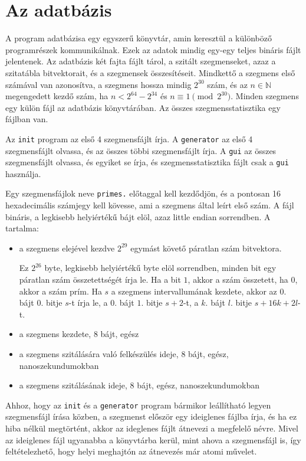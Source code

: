 \section{Az adatbázis}

A program adatbázisa egy egyszerű könyvtár, amin keresztül a különböző programrészek kommunikálnak.
Ezek az adatok mindig egy-egy teljes bináris fájlt jelentenek.
Az adatbázis két fajta fájlt tárol, a szitált szegmenseket, azaz a szitatábla bitvektorait, és a szegmensek összesítéseit.
Mindkettő a szegmens első számával van azonosítva, a szegmens hossza mindig $2^{30}$ szám, és az $n \in \mathbb{N}$ megengedett kezdő szám, ha $n < 2^{64}-2^{34}$ és $n \equiv 1 \pmod{2^{30}}$.
Minden szegmens egy külön fájl az adatbázis könyvtárában.
Az összes szegmensstatisztika egy fájlban van.

Az \texttt{init} program az első 4 szegmensfájlt írja.
A \texttt{generator} az első 4 szegmensfájlt olvassa, és az összes többi szegmensfájlt írja.
A \texttt{gui} az összes szegmensfájlt olvassa, és egyiket se írja, és szegmensstatisztika fájlt csak a \texttt{gui} használja.

Egy szegmensfájlok neve \texttt{primes.} előtaggal kell kezdődjön, és a pontosan 16 hexadecimális számjegy kell kövesse, ami a szegmens által leírt első szám.
A fájl bináris, a legkisebb helyiértékű bájt elöl, azaz little endian sorrendben.
A tartalma:
\begin{itemize}
\item a szegmens elejével kezdve $2^{29}$ egymást követő páratlan szám bitvektora.
	
Ez $2^{26}$ byte, legkisebb helyiértékű byte elöl sorrendben, minden bit egy páratlan szám összetettségét írja le.
Ha a bit $1$, akkor a szám összetett, ha $0$, akkor a szám prím.
Ha $s$ a szegmens intervallumának kezdete, akkor az $0.$ bájt $0.$ bitje $s$-t írja le, a $0.$ bájt $1.$ bitje $s+2$-t, a $k.$ bájt $l.$ bitje $s+16k+2l$-t.
	
\item a szegmens kezdete, 8 bájt, egész
\item a szegmens szitálására való felkészülés ideje, 8 bájt, egész, nanoszekundumokban
\item a szegmens szitálásának ideje, 8 bájt, egész, nanoszekundumokban
\end{itemize}

Ahhoz, hogy az \texttt{init} és a \texttt{generator} program bármikor leállítható legyen szegmensfájl írása közben, a szegmenst először egy ideiglenes fájlba írja, és ha ez hiba nélkül megtörtént, akkor az ideglenes fájlt átnevezi a megfelelő névre.
Mivel az ideiglenes fájl ugyanabba a könyvtárba kerül, mint ahova a szegmensfájl is, így feltételezhető, hogy helyi meghajtón az átnevezés már atomi művelet.

